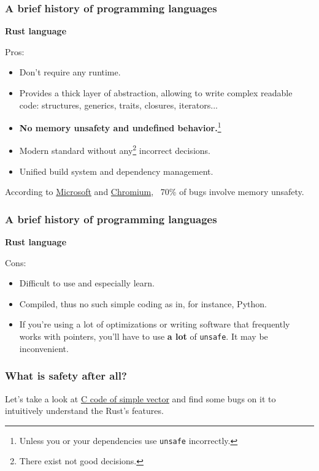 \documentclass[aspectratio=1610,t]{beamer}
\begin{document}
\begin{frame}
\frametitle{A brief history of programming languages}
\textbf{Rust language}

Pros:
\begin{itemize}
    \item Don't require any runtime.
    \item Provides a thick layer of abstraction, allowing to write complex readable code: structures, generics, traits, closures, iterators...
    \item \textbf{No memory unsafety and undefined behavior.}\footnote{Unless you or your dependencies use \texttt{unsafe} incorrectly.}
    \item Modern standard without any\footnote{There exist not good decisions.} incorrect decisions.
    \item Unified build system and dependency management.
\end{itemize}

According to \href{https://www.zdnet.com/article/microsoft-70-percent-of-all-security-bugs-are-memory-safety-issues/}{Microsoft} and \href{https://www.chromium.org/Home/chromium-security/memory-safety}{Chromium}, ~70\% of bugs involve memory unsafety.
\end{frame}


\begin{frame}
\frametitle{A brief history of programming languages}
\textbf{Rust language}

Cons:
\begin{itemize}
    \item Difficult to use and especially learn.
    \item Compiled, thus no such simple coding as in, for instance, Python.
    \item If you're using a lot of optimizations or writing software that frequently works with pointers, you'll have to use \textbf{a lot} of \texttt{unsafe}. It may be inconvenient.
\end{itemize}
\end{frame}


\begin{frame}
\frametitle{What is safety after all?}

Let's take a look at \href{run:code/vector.c}{C code of simple vector} and find some bugs on it to intuitively understand the Rust's features.

\end{frame}
\end{document}
